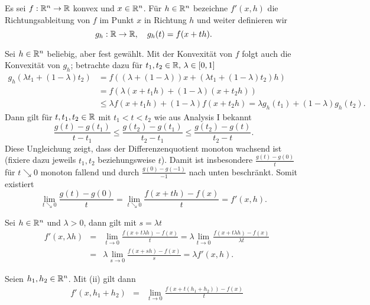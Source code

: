 Es sei $f:\mathbb{R}^n\to \mathbb{R}$ konvex und $x\in \mathbb{R}^n$. Für $h\in \mathbb{R}^n$ bezeichne $f'(x,h)$ die Richtungsableitung von $f$ im Punkt $x$ in Richtung $h$ und
weiter definieren wir 
\begin{displaymath}
 g_h:\mathbb{R}\to\mathbb{R},\quad g_h(t)=f(x+th).
\end{displaymath}

\begin{compactenum}[(i)]
 \item %
 Sei $h\in\mathbb{R}^n$ beliebig, aber fest gewählt. Mit der Konvexität von $f$ folgt auch die Konvexität von $g_h$;
 betrachte dazu für $t_1,t_2\in \mathbb{R}, \, \lambda\in[0,1]$
 \begin{align*}
  g_h(\lambda t_1+(1-\lambda)t_2)&= f((\lambda+(1-\lambda))x+(\lambda t_1+(1-\lambda)t_2)h)\\
  &=f(\lambda(x+t_1h)+(1-\lambda)(x+t_2h))\\
  &\leq \lambda f(x+t_1h)+(1-\lambda)f(x+t_2h)=\lambda g_h(t_1)+(1-\lambda)g_h(t_2).
 \end{align*}
 Dann gilt für $t,t_1,t_2\in \mathbb{R}$ mit $t_1<t<t_2$ wie aus Analysis I bekannt
 \begin{displaymath}
  \frac{g(t)-g(t_1)}{t-t_1}\leq\frac{g(t_2)-g(t_1)}{t_2-t_1}\leq\frac{g(t_2)-g(t)}{t_2-t}.
 \end{displaymath}
Diese Ungleichung zeigt, dass der Differenzenquotient monoton wachsend ist (fixiere dazu jeweils $t_1,t_2$ beziehungsweise $t$). Damit ist insbesondere $\frac{g(t)-g(0)}{t}$ für $t\searrow0$ monoton fallend und durch $\frac{g(0)-g(-1)}{-1}$ nach unten beschränkt.
 Somit existiert 
 \begin{displaymath}
  \lim_{t\searrow 0} \frac{g(t)-g(0)}{t}=\lim_{t\searrow 0}\frac{f(x+th)-f(x)}{t}=f'(x,h).
 \end{displaymath}
 \item Sei $h\in\mathbb{R}^n$ und $\lambda>0$, dann gilt mit $s=\lambda t$
 \begin{align*}
  &f'(x,\lambda h)&=&\lim_{t\to 0}\frac{f(x+t\lambda h)-f(x)}{t}=\lambda\lim_{t\to 0}\frac{f(x+t\lambda h)-f(x)}{\lambda t}\\
  &&=&\lambda\lim_{s\to 0}\frac{f(x+s h)-f(x)}{s}=\lambda f'(x,h).
 \end{align*}
 \item Seien $h_1, h_2\in\mathbb{R}^n$. Mit (ii) gilt dann
 \begin{align*}
  &f'(x,h_1+h_2)&=&\lim_{t\to 0} \frac{f(x+t(h_1+h_2))-f(x)}{t}\\

\end{align*}
\end{compactenum}
